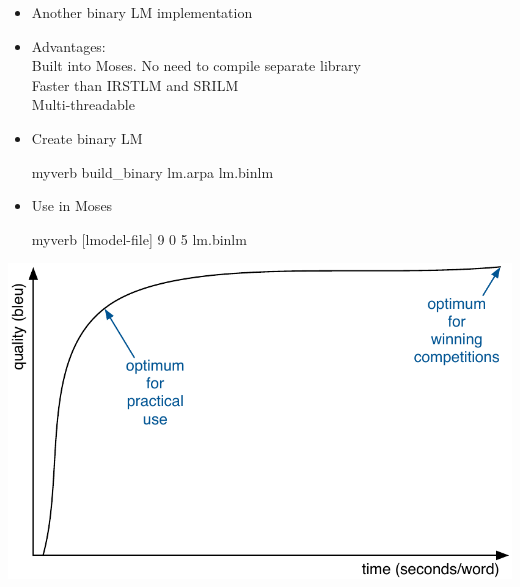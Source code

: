 \documentclass[landscape]{uedslides2C}
\begin{document}
\begin{itemize}
\item Another binary LM implementation
\item Advantages:
  \\ Built into Moses. No need to compile separate library
  \\ Faster than IRSTLM and SRILM
  \\ Multi-threadable

\item {Create binary LM}
\begin{SaveVerbatim}{myverb} 
  build_binary lm.arpa lm.binlm
\end{SaveVerbatim}
\colorbox{gray}{}

\item {Use in Moses}
\begin{SaveVerbatim}{myverb} 
  [lmodel-file]
  9 0 5 lm.binlm
\end{SaveVerbatim}
\colorbox{gray}{}

\end{itemize}


\vspace{5mm}
\begin{center} 
\includegraphics[scale=1.4]{quality-vs-speed.pdf}\vspace{-20mm}
\end{center}

\end{document}
